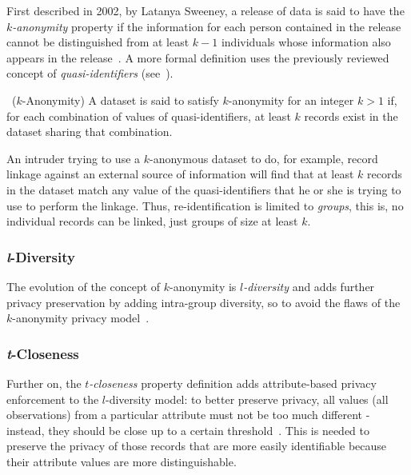 First described in 2002, by Latanya Sweeney, a release of data is said to have the \textit{$k$-anonymity} property if the information for each person contained in the release cannot be distinguished from at least $k-1$ individuals whose information also appears in the release~\citep{Sweeney:kAnonymity}. A more formal definition uses the previously reviewed concept of \textit{quasi-identifiers} (see~).

\begin{definition}~($k$-Anonymity)
A dataset is said to satisfy $k$-anonymity for an integer $k > 1$ if, for each combination of values of quasi-identifiers, at least $k$ records exist in the dataset sharing that combination.~\citep{Domingo:EnhancingDiffPrivMicroaggregation}
\end{definition}

An intruder trying to use a $k$-anonymous dataset to do, for example, record linkage against an external source of information will find that at least $k$ records in the dataset match any value of the quasi-identifiers that he or she is trying to use to perform the linkage. Thus, re-identification is limited to \textit{groups}, this is, no individual records can be linked, just groups of size at least $k$.

\subsubsection{\textit{l}-Diversity}

The evolution of the concept of $k$-anonymity is \textit{$l$-diversity} and adds further privacy preservation by adding intra-group diversity, so to avoid the flaws of the $k$-anonymity privacy model~\citep{Machanavajjhala:lDiversity}.

\subsubsection{\textit{t}-Closeness}

Further on, the \textit{$t$-closeness} property definition adds attribute-based privacy enforcement to the $l$-diversity model: to better preserve privacy, all values (all observations) from a particular attribute must not be too much different - instead, they should be close up to a certain threshold~\citep{Ninghui:tCloseness}. This is needed to preserve the privacy of those records that are more easily identifiable because their attribute values are more distinguishable.

